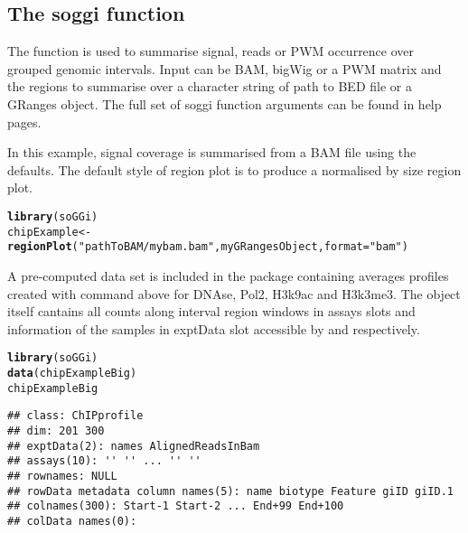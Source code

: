 \documentclass[12pt]{article}\usepackage[]{graphicx}\usepackage[usenames,dvipsnames]{color}
\makeatletter
\newcommand{\hlstr}[1]{\textcolor[rgb]{0.192,0.494,0.8}{#1}}%
\newcommand{\hlstd}[1]{\textcolor[rgb]{0.345,0.345,0.345}{#1}}%
\newcommand{\hlkwb}[1]{\textcolor[rgb]{0.69,0.353,0.396}{#1}}%
\newcommand{\hlkwc}[1]{\textcolor[rgb]{0.333,0.667,0.333}{#1}}%
\newcommand{\hlkwd}[1]{\textcolor[rgb]{0.737,0.353,0.396}{\textbf{#1}}}%
\newenvironment{kframe}{%
 \def\at@end@of@kframe{}%
 \ifinner\ifhmode%
  \def\at@end@of@kframe{\end{minipage}}%
  \begin{minipage}{\columnwidth}%
 \fi\fi%
 \def\FrameCommand##1{\hskip\@totalleftmargin \hskip-\fboxsep
 \colorbox{shadecolor}{##1}\hskip-\fboxsep
     \hskip-\linewidth \hskip-\@totalleftmargin \hskip\columnwidth}%
 \MakeFramed {\advance\hsize-\width
   \@totalleftmargin\z@ \linewidth\hsize
   \@setminipage}}%
 {\par\unskip\endMakeFramed%
 \at@end@of@kframe}
\newenvironment{knitrout}{}{} %
\makeatother
\begin{document}
\subsection{The soggi function}

The  function is used to summarise signal, reads or PWM occurrence over grouped genomic intervals. Input can be BAM, bigWig or a PWM matrix and the regions to summarise over a character string of path to BED file or a GRanges object. The full set of soggi function arguments can be found in help pages.


In this example, signal coverage is summarised from a BAM file using the defaults. The default style of region plot is to produce a normalised by size region plot.

\begin{knitrout}
\color{fgcolor}\begin{kframe}
\begin{alltt}
\hlkwd{library}\hlstd{(soGGi)}
\hlstd{chipExample} \hlkwb{<-} \hlkwd{regionPlot}\hlstd{(}\hlstr{"pathToBAM/mybam.bam"}\hlstd{,myGRangesObject,}\hlkwc{format}\hlstd{=}\hlstr{"bam"}\hlstd{)}
\end{alltt}
\end{kframe}
\end{knitrout}

A pre-computed data set is included in the package containing averages profiles created with command above for DNAse, Pol2, H3k9ac and H3k3me3. The object itself cantains all counts along interval region windows in assays slots and information of the samples in exptData slot accessible by  and  respectively.


\begin{knitrout}
\color{fgcolor}\begin{kframe}
\begin{alltt}
\hlkwd{library}\hlstd{(soGGi)}
\hlkwd{data}\hlstd{(chipExampleBig)}
\hlstd{chipExampleBig}
\end{alltt}
\begin{verbatim}
## class: ChIPprofile 
## dim: 201 300 
## exptData(2): names AlignedReadsInBam
## assays(10): '' '' ... '' ''
## rownames: NULL
## rowData metadata column names(5): name biotype Feature giID giID.1
## colnames(300): Start-1 Start-2 ... End+99 End+100
## colData names(0):
\end{verbatim}
\end{kframe}
\end{knitrout}
\end{document}
